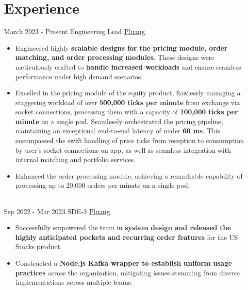 \documentclass[letterpaper]{twentysecondcv} %
\begin{document}
\makeprofile %
 

\section{Experience}
\begin{twenty} %
    \twentyitem
    	{March 2023 -}
		{Present}
        {Engineering Lead}
        {\href{https://pluang.com/}{Pluang}}
        {}
        {\begin{itemize}
        \item Engineered highly \textbf{scalable designs for the pricing module, order matching, and order processing modules}. These designs were meticulously crafted to \textbf{handle increased workloads} and ensure seamless performance under high demand scenarios.
        \item Excelled in the pricing module of the equity product, flawlessly managing a staggering workload of over \textbf{500,000 ticks per minute} from exchange via socket connections, processing them with a capacity of \textbf{100,000 ticks per minute} on a single pod. Seamlessly orchestrated the pricing pipeline, maintaining an exceptional end-to-end latency of under \textbf{60 ms}. This encompassed the swift handling of price ticks from reception to consumption by user's socket connections on app, as well as seamless integration with internal matching and portfolio services.
        \item Enhanced the order processing module, achieving a remarkable capability of processing up to 20,000 orders per minute on a single pod.
        \end{itemize}}
    \\
    \twentyitem
    	{Sep 2022 -}
		{Mar 2023}
        {SDE-3}
        {\href{https://pluang.com/}{Pluang}}
        {}
        {\begin{itemize}
        \item Successfully empowered the team in \textbf{system design and released the highly anticipated pockets and recurring order features} for the US Stocks product.
        \item Constructed a \textbf{Node.js Kafka wrapper to establish uniform usage practices} across the organization, mitigating issues stemming from diverse implementations across multiple teams.

\end{itemize}}
\end{twenty}
\end{document}
